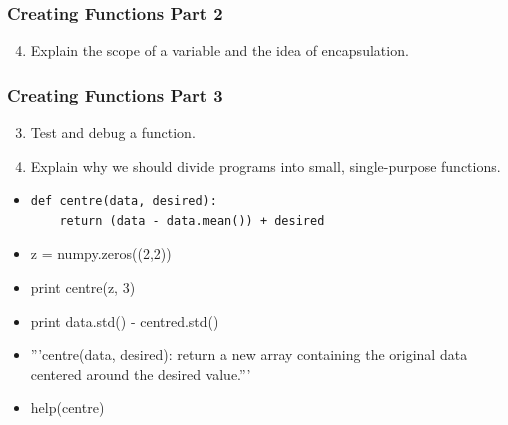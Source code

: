\documentclass[xcolor=dvipsnames]{beamer}
\begin{document}
\begin{frame}
\frametitle{Creating Functions Part 2}
\begin{enumerate}
\setcounter{enumi}{3}
\item    Explain the scope of a variable and the idea of encapsulation.
\end{enumerate}
\end{frame}


\begin{frame}[fragile]
\frametitle{Creating Functions Part 3}
\begin{enumerate}
\setcounter{enumi}{2}
\item    Test and debug a function.
\item    Explain why we should divide programs into small, single-purpose functions.
\end{enumerate}
\begin{itemize}
\item 
\begin{verbatim} 
def centre(data, desired):
    return (data - data.mean()) + desired
\end{verbatim}
\item z = numpy.zeros((2,2))
\item print centre(z, 3)
\item print data.std() - centred.std()
\item '''centre(data, desired): return a new array containing the original data centered around the desired value.'''
\item help(centre)
\end{itemize}
\end{frame}
\end{document}

